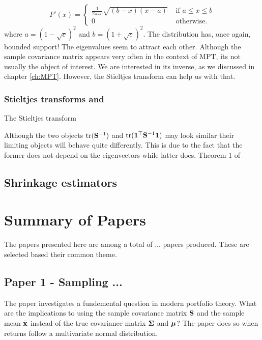 \documentclass[]{book}\usepackage{knitr}
\begin{document}
$$
F'(x) = \begin{cases}
\frac{1}{2\pi x c} \sqrt{(b-x)(x-a)} & \text{ if } a \leq x \leq b\\
0 & \text{ otherwise.}
\end{cases}
$$
where $a=(1-\sqrt{c})^2$ and $b=(1+\sqrt{c})^2$. The distribution has, once again, bounded support! The eigenvalues seem to attract each other. Although the sample covariance matrix appears very often in the context of MPT, its not usually the object of interest. We are interested in its inverse, as we discussed in chapter \ref{ch:MPT}. However, the Stieltjes transform can help us with that.

\subsection{Stieltjes transforms and \citet{rubio2011spectral}}
The Stieltjes transform 

Although the two objects $\operatorname{tr}(\mathbf{S}^{-1})$ and $\operatorname{tr}(\mathbf{1}^\top \mathbf{S}^{-1} \mathbf{1})$ may look similar their limiting objects will behave quite differently. This is due to the fact that the former does not depend on the eigenvectors while latter does.  Theorem 1 of \citet{rubio2011spectral}
\section{Shrinkage estimators}




\chapter{Summary of Papers}\label{ch:papersummary}

The papers presented here are among a total of ... papers produced. These are selected based their common theme.
\section*{Paper 1 - Sampling ...}
The paper investigates a fundemental question in modern portfolio theory. 
What are the implications to using the sample covariance matrix $\mathbf{S}$ and the sample mean $\bar{\mathbf{x}}$ instead of the true covariance matrix $\mathbf{\Sigma}$ and $\mbox{\boldmath$\mu$}$?
The paper does so when returns follow a multivariate normal distribution.
\end{document}
